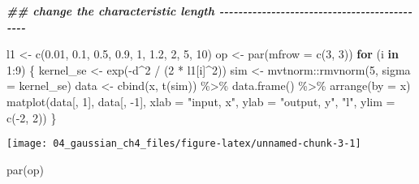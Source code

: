 \documentclass[
]{article}
\newenvironment{Shaded}{\begin{snugshade}}{\end{snugshade}}
\newcommand{\AttributeTok}[1]{\textcolor[rgb]{0.77,0.63,0.00}{#1}}
\newcommand{\ControlFlowTok}[1]{\textcolor[rgb]{0.13,0.29,0.53}{\textbf{#1}}}
\newcommand{\DecValTok}[1]{\textcolor[rgb]{0.00,0.00,0.81}{#1}}
\newcommand{\DocumentationTok}[1]{\textcolor[rgb]{0.56,0.35,0.01}{\textbf{\textit{#1}}}}
\newcommand{\FloatTok}[1]{\textcolor[rgb]{0.00,0.00,0.81}{#1}}
\newcommand{\FunctionTok}[1]{\textcolor[rgb]{0.00,0.00,0.00}{#1}}
\newcommand{\NormalTok}[1]{#1}
\newcommand{\OtherTok}[1]{\textcolor[rgb]{0.56,0.35,0.01}{#1}}
\newcommand{\SpecialCharTok}[1]{\textcolor[rgb]{0.00,0.00,0.00}{#1}}
\newcommand{\StringTok}[1]{\textcolor[rgb]{0.31,0.60,0.02}{#1}}
\begin{document}
\begin{Shaded}
\begin{Highlighting}[]
\DocumentationTok{\#\# change the characteristic length {-}{-}{-}{-}{-}{-}{-}{-}{-}{-}{-}{-}{-}{-}{-}{-}{-}{-}{-}{-}{-}{-}{-}{-}{-}{-}{-}{-}{-}{-}{-}{-}{-}{-}{-}{-}{-}{-}{-}{-}{-}{-}{-}{-}{-}}

\NormalTok{l1 }\OtherTok{\textless{}{-}} \FunctionTok{c}\NormalTok{(}\FloatTok{0.01}\NormalTok{, }\FloatTok{0.1}\NormalTok{,  }\FloatTok{0.5}\NormalTok{,}
         \FloatTok{0.9}\NormalTok{,   }\DecValTok{1}\NormalTok{,  }\FloatTok{1.2}\NormalTok{, }
           \DecValTok{2}\NormalTok{,   }\DecValTok{5}\NormalTok{,  }\DecValTok{10}\NormalTok{)}
\NormalTok{op }\OtherTok{\textless{}{-}} \FunctionTok{par}\NormalTok{(}\AttributeTok{mfrow =} \FunctionTok{c}\NormalTok{(}\DecValTok{3}\NormalTok{, }\DecValTok{3}\NormalTok{))}
\ControlFlowTok{for}\NormalTok{ (i }\ControlFlowTok{in} \DecValTok{1}\SpecialCharTok{:}\DecValTok{9}\NormalTok{) \{}
\NormalTok{  kernel\_se }\OtherTok{\textless{}{-}} \FunctionTok{exp}\NormalTok{(}\SpecialCharTok{{-}}\NormalTok{d}\SpecialCharTok{\^{}}\DecValTok{2} \SpecialCharTok{/}\NormalTok{ (}\DecValTok{2} \SpecialCharTok{*}\NormalTok{ l1[i]}\SpecialCharTok{\^{}}\DecValTok{2}\NormalTok{)) }
\NormalTok{  sim }\OtherTok{\textless{}{-}}\NormalTok{ mvtnorm}\SpecialCharTok{::}\FunctionTok{rmvnorm}\NormalTok{(}\DecValTok{5}\NormalTok{, }\AttributeTok{sigma =}\NormalTok{ kernel\_se)}
\NormalTok{  data }\OtherTok{\textless{}{-}} \FunctionTok{cbind}\NormalTok{(x, }\FunctionTok{t}\NormalTok{(sim)) }\SpecialCharTok{\%\textgreater{}\%} 
    \FunctionTok{data.frame}\NormalTok{() }\SpecialCharTok{\%\textgreater{}\%}
    \FunctionTok{arrange}\NormalTok{(}\AttributeTok{by =}\NormalTok{ x)}
  \FunctionTok{matplot}\NormalTok{(data[, }\DecValTok{1}\NormalTok{], data[, }\SpecialCharTok{{-}}\DecValTok{1}\NormalTok{], }
          \AttributeTok{xlab =} \StringTok{"input, x"}\NormalTok{, }\AttributeTok{ylab =} \StringTok{"output, y"}\NormalTok{,}
          \StringTok{"l"}\NormalTok{, }\AttributeTok{ylim =} \FunctionTok{c}\NormalTok{(}\SpecialCharTok{{-}}\DecValTok{2}\NormalTok{, }\DecValTok{2}\NormalTok{))}
\NormalTok{\}}
\end{Highlighting}
\end{Shaded}

\begin{center}\texttt{[image: 04\_gaussian\_ch4\_files/figure-latex/unnamed-chunk-3-1]} \end{center}

\begin{Shaded}
\begin{Highlighting}[]
\FunctionTok{par}\NormalTok{(op)}
\end{Highlighting}
\end{Shaded}
\end{document}
